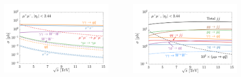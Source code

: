 \documentclass[aspectratio=169]{beamer}
\begin{document}
\begin{frame}
\begin{columns}
\begin{column}{0.42\textwidth}
		\end{column}
	\end{columns}
	\begin{columns}
		\begin{column}{0.42\textwidth}
			\includegraphics[width=0.88\textwidth]{figs/sigma_mmCollider_c10_3pt_s20}
		\end{column}
		\begin{column}{0.42\textwidth}
			\includegraphics[width=0.88\textwidth]{figs/dijjet_mu_10d_3pt_s20}
		\end{column}
	\end{columns}
\end{frame}
\end{document}

